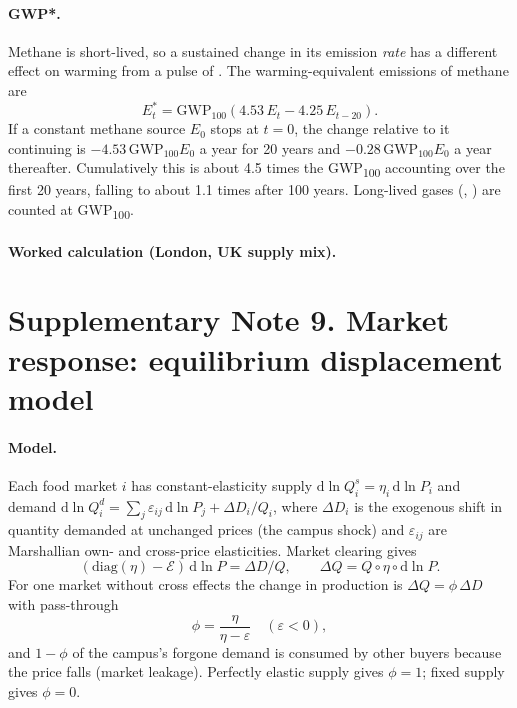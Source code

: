 \documentclass[10pt]{article}
\begin{document}
\paragraph{GWP*.} Methane is short-lived, so a sustained change in its emission
\emph{rate} has a different effect on warming from a pulse of \COtwo{}. The
warming-equivalent emissions of methane are\cite{smith2021gwpstar,cain2019gwpstar}
\begin{equation}
E^{*}_{t} = \mathrm{GWP}_{100}\left(4.53\,E_t - 4.25\,E_{t-20}\right).
\end{equation}
If a constant methane source $E_0$ stops at $t=0$, the change relative to it
continuing is $-4.53\,\mathrm{GWP}_{100}E_0$ a year for 20 years and
$-0.28\,\mathrm{GWP}_{100}E_0$ a year thereafter. Cumulatively this is about 4.5
times the GWP\textsubscript{100} accounting over the first 20 years, falling to about 1.1 times
after 100 years. Long-lived gases (\COtwo{}, \NtwoO{}) are counted at
GWP\textsubscript{100}.

\paragraph{Worked calculation (London, UK supply mix).}


\section{Supplementary Note 9. Market response: equilibrium displacement model}
\label{si:edm}

\paragraph{Model.} Each food market $i$ has constant-elasticity supply
$\mathrm{d}\ln Q^{s}_i = \eta_i\,\mathrm{d}\ln P_i$ and demand
$\mathrm{d}\ln Q^{d}_i = \sum_j \varepsilon_{ij}\,\mathrm{d}\ln P_j + \Delta D_i/Q_i$,
where $\Delta D_i$ is the exogenous shift in quantity demanded at unchanged
prices (the campus shock) and $\varepsilon_{ij}$ are Marshallian own- and
cross-price elasticities\cite{alston1995science,wohlgenant1993}. Market clearing gives
\begin{equation}
(\mathrm{diag}(\eta) - \mathcal{E})\,\mathrm{d}\ln P = \Delta D / Q, \qquad
\Delta Q = Q \circ \eta \circ \mathrm{d}\ln P .
\end{equation}
For one market without cross effects the change in production is
$\Delta Q = \phi\,\Delta D$ with pass-through
\begin{equation}
\phi = \frac{\eta}{\eta - \varepsilon}\quad(\varepsilon<0),
\end{equation}
and $1-\phi$ of the campus's forgone demand is consumed by other buyers
because the price falls (market leakage). Perfectly elastic supply gives
$\phi=1$; fixed supply gives $\phi=0$.
\end{document}
